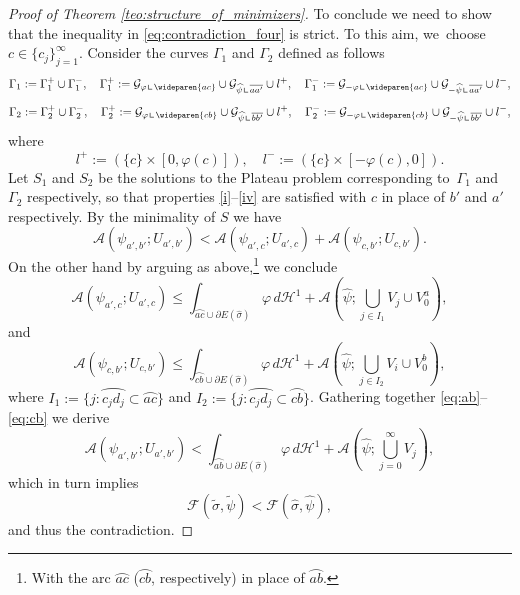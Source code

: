 \documentclass[JEP,XML,SOM,Unicode, NoFloatCountersInSection,published]{cedram}
\let\arc\wideparen
\newcommand{\resa}{\mathop{\hbox{\vrule height 7pt width 0.5pt depth 0pt
\vrule height 0.5pt width 6pt depth 0pt}}\nolimits}
\newcommand{\resb}{\mathop{\hbox{\vrule height 4pt width 0.5pt depth 0pt
\vrule height 0.5pt width 3pt depth 0pt}}\nolimits}
\newcommand{\res}{\mathchoice{\resa}{\resa}{\resb}{\resb}}
\theoremstyle{definition}
\begin{document}
\begin{proof}[Proof of Theorem \ref{teo:structure_of_minimizers}]
To conclude we need to show that the inequality in \eqref{eq:contradiction_four} is strict. To this aim, we~choose $c\in\{c_j\}_{j=1}^\infty$.
Consider the curves $\Gamma_1$ and $\Gamma_2$ defined as follows
\begin{equation*}
\Gamma_1:=\Gamma_1^+\cup\Gamma_1^-,\quad \Gamma_1^+:=\mathcal{G}_{\varphi\res\arc{ac}}
\cup\mathcal{G}_{\widehat\psi\res\overline{aa'}}\cup l^+
,\quad
\Gamma_1^-:=\mathcal{G}_{-\varphi\res\arc{ac}}
\cup\mathcal{G}_{-\widehat\psi\res\overline{aa'}}\cup l^-,
\end{equation*}
\begin{equation*}
\Gamma_2:=\Gamma_2^+\cup\Gamma_2^-,\quad \Gamma_2^+:=\mathcal{G}_{\varphi\res\arc{cb}}
\cup\mathcal{G}_{\widehat\psi\res\overline{bb'}}\cup l^+
,\quad
\Gamma_2^-:=\mathcal{G}_{-\varphi\res\arc{cb}}
\cup\mathcal{G}_{-\widehat\psi\res\overline{bb'}}\cup l^-,
\end{equation*}
where\vspace*{-3pt}
\begin{equation*}
l^+:=(\{c\}\times[0,\varphi(c)]),\quad
l^-:=(\{c\}\times[-\varphi(c),0]).
\end{equation*}
Let $S_1$ and $S_2$ be the solutions to the Plateau problem corresponding to~$\Gamma_1$ and~$\Gamma_2$ respectively, so that properties \ref{i}--\ref{iv} are satisfied with $c$ in place of $b'$ and $a'$ respectively.
By the minimality of $S$ we have
\begin{equation}\label{eq:ab}
\mathcal{A}(\psi_{a',b'};U_{a',b'})<\mathcal{A}(\psi_{a',c};U_{a',c})+\mathcal{A}(\psi_{c,b'};U_{c,b'}).
\end{equation}\label{eq:ac}
On the other hand by arguing as above,\footnote{With the arc $\arc{ac}$ ($\arc{cb}$, respectively) in place of $\arc{ab}$.} we conclude
\begin{equation}
\mathcal{A}(\psi_{a',c};U_{a',c})\le\int_{\arc{ac}\cup\partial E(\widehat\sigma)}\varphi\,d\mathcal{H}^1+\mathcal{A}(\widehat\psi;\bigcup_{j\in I_1} V_j\cup V^a_0),
\end{equation}
and\vspace*{-3pt}
\begin{equation}\label{eq:cb}
\mathcal{A}(\psi_{c,b'};U_{c,b'})\le\int_{\arc{cb}\cup\partial E(\widehat\sigma)}\varphi\,d\mathcal{H}^1+\mathcal{A}(\widehat\psi;\bigcup_{j\in I_2} V_i\cup V^b_0),
\end{equation}
where $I_1:=\{j\colon \arc{c_jd_j}\subset\arc{ac}\}$ and $I_2:=\{j\colon \arc{c_jd_j}\subset\arc{cb}\}$. Gathering together \eqref{eq:ab}--\eqref{eq:cb} we derive\vspace*{-3pt}
\begin{equation*}
\mathcal{A}(\psi_{a',b'};U_{a',b'})<
\int_{\arc{ab}\cup\partial E(\widehat\sigma)}\varphi\,d\mathcal{H}^1+\mathcal{A}(\widehat\psi;\bigcup_{j=0}^\infty V_j),
\end{equation*}
which in turn implies\vspace*{-3pt}
\begin{equation*}
{\mathcal F}(\widetilde\sigma,\widetilde\psi)<
{\mathcal F}(\widehat\sigma,\widehat\psi),
\end{equation*}
and thus the contradiction.


\end{proof}
\end{document}
